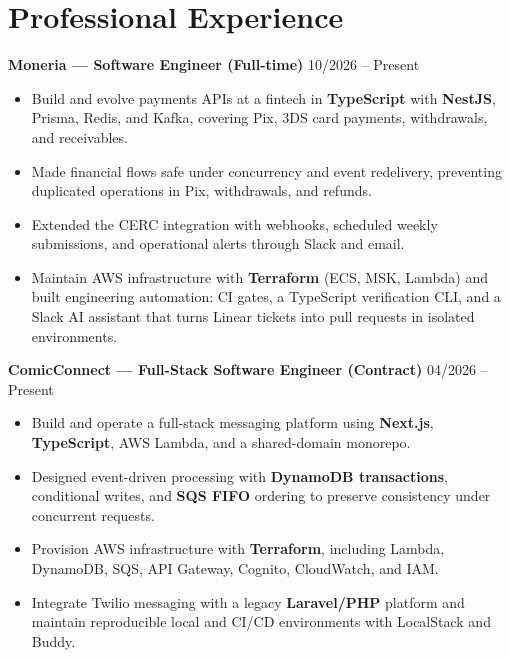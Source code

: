 \documentclass[a4paper,10pt]{article}
\begin{document}
\section*{Professional Experience}

\textbf{Moneria — Software Engineer (Full-time)} \hfill 10/2026 -- Present
\begin{itemize}[leftmargin=*, itemsep=2pt]
    \item Build and evolve payments APIs at a fintech in \textbf{TypeScript} with \textbf{NestJS}, Prisma, Redis, and Kafka, covering Pix, 3DS card payments, withdrawals, and receivables.
    \item Made financial flows safe under concurrency and event redelivery, preventing duplicated operations in Pix, withdrawals, and refunds.
    \item Extended the CERC integration with webhooks, scheduled weekly submissions, and operational alerts through Slack and email.
    \item Maintain AWS infrastructure with \textbf{Terraform} (ECS, MSK, Lambda) and built engineering automation: CI gates, a TypeScript verification CLI, and a Slack AI assistant that turns Linear tickets into pull requests in isolated environments.
\end{itemize}

\textbf{ComicConnect — Full-Stack Software Engineer (Contract)} \hfill 04/2026 -- Present
\begin{itemize}[leftmargin=*, itemsep=2pt]
    \item Build and operate a full-stack messaging platform using \textbf{Next.js}, \textbf{TypeScript}, AWS Lambda, and a shared-domain monorepo.
    \item Designed event-driven processing with \textbf{DynamoDB transactions}, conditional writes, and \textbf{SQS FIFO} ordering to preserve consistency under concurrent requests.
    \item Provision AWS infrastructure with \textbf{Terraform}, including Lambda, DynamoDB, SQS, API Gateway, Cognito, CloudWatch, and IAM.
    \item Integrate Twilio messaging with a legacy \textbf{Laravel/PHP} platform and maintain reproducible local and CI/CD environments with LocalStack and Buddy.
\end{itemize}
\end{document}
